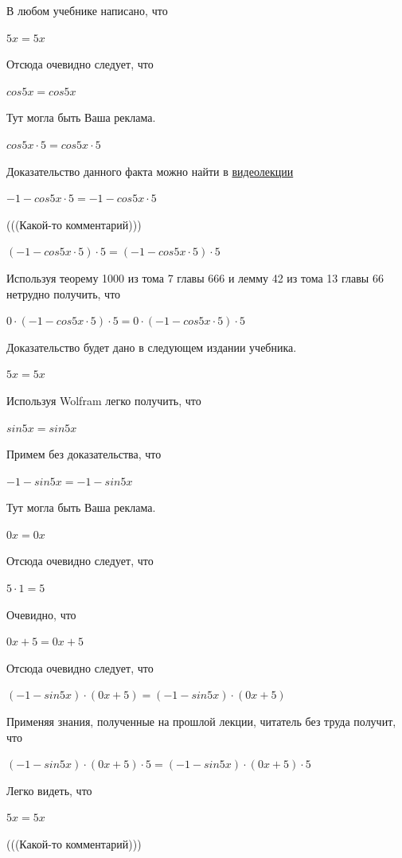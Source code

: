 \documentclass[12pt,a4paper,fleqn]{article}
\theoremstyle{definition}
\begin{document}
В любом учебнике написано, что 

$ 5  x  =  5  x $

Отсюда очевидно следует, что 

$cos 5  x  = cos 5  x $

Тут могла быть Ваша реклама. 

$cos 5  x  \cdot  5  = cos 5  x  \cdot  5 $

Доказательство данного факта можно найти в \href{https://www.youtube.com/watch?v=dQw4w9WgXcQ}{видеолекции} 

$ -1  - cos 5  x  \cdot  5  =  -1  - cos 5  x  \cdot  5 $

(((Какой-то комментарий))) 

$( -1  - cos 5  x  \cdot  5 ) \cdot  5  = ( -1  - cos 5  x  \cdot  5 ) \cdot  5 $

Используя теорему 1000 из тома 7 главы 666 и лемму 42 из тома 13 главы 66 нетрудно получить, что 

$ 0  \cdot ( -1  - cos 5  x  \cdot  5 ) \cdot  5  =  0  \cdot ( -1  - cos 5  x  \cdot  5 ) \cdot  5 $

Доказательство будет дано в следующем издании учебника. 

$ 5  x  =  5  x $

Используя Wolfram легко получить, что 

$sin 5  x  = sin 5  x $

Примем без доказательства, что 

$ -1  - sin 5  x  =  -1  - sin 5  x $

Тут могла быть Ваша реклама. 

$ 0  x  =  0  x $

Отсюда очевидно следует, что 

$ 5  \cdot  1  =  5 $

Очевидно, что 

$ 0  x  +  5  =  0  x  +  5 $

Отсюда очевидно следует, что 

$( -1  - sin 5  x ) \cdot ( 0  x  +  5 ) = ( -1  - sin 5  x ) \cdot ( 0  x  +  5 )$

Применяя знания, полученные на прошлой лекции, читатель без труда получит, что 

$( -1  - sin 5  x ) \cdot ( 0  x  +  5 ) \cdot  5  = ( -1  - sin 5  x ) \cdot ( 0  x  +  5 ) \cdot  5 $

Легко видеть, что 

$ 5  x  =  5  x $

(((Какой-то комментарий))) 
\end{document}
